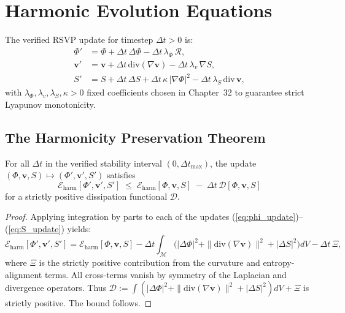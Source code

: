 \section{Harmonic Evolution Equations}

The verified RSVP update for timestep $\Delta t>0$ is:
\begin{align}
  \Phi' &= \Phi + \Delta t\,\Delta\Phi
                 - \Delta t\,\lambda_\Phi\,\mathcal{R},
\label{eq:phi_update}
\\[4pt]
  \mathbf{v}' &= \mathbf{v}
                 + \Delta t\,\mathrm{div}(\nabla\mathbf{v})
                 - \Delta t\,\lambda_v\,\nabla S,
\label{eq:v_update}
\\[4pt]
  S' &= S + \Delta t\,\Delta S
          + \Delta t\,\kappa\,|\nabla\Phi|^2
          - \Delta t\,\lambda_S\,\mathrm{div}\,\mathbf{v},
\label{eq:S_update}
\end{align}
with $\lambda_\Phi,\lambda_v,\lambda_S,\kappa>0$ fixed coefficients chosen in
Chapter~32 to guarantee strict Lyapunov monotonicity.

\subsection{The Harmonicity Preservation Theorem}

\begin{theorem}
\label{thm:harmonicity}
For all $\Delta t$ in the verified stability interval
$(0,\Delta t_{\mathrm{max}})$, the update
$(\Phi,\mathbf{v},S) \mapsto (\Phi',\mathbf{v}',S')$ satisfies
\[
\mathcal{E}_{\mathrm{harm}}[\Phi',\mathbf{v}',S']
\;\leq\;
\mathcal{E}_{\mathrm{harm}}[\Phi,\mathbf{v},S]
\;-\;
\Delta t\,\mathcal{D}[\Phi,\mathbf{v},S]
\]
for a strictly positive dissipation functional $\mathcal{D}$.
\end{theorem}

\begin{proof}
Applying integration by parts to each of the updates
(\ref{eq:phi_update})–(\ref{eq:S_update}) yields:
\[
\mathcal{E}_{\mathrm{harm}}[\Phi',\mathbf{v}',S']
=
\mathcal{E}_{\mathrm{harm}}[\Phi,\mathbf{v},S]
  - \Delta t\int_{\mathcal{M}}
     \bigl(
       |\Delta\Phi|^2
       + \|\mathrm{div}(\nabla\mathbf{v})\|^2
       + |\Delta S|^2
     \bigr)
     dV
     - \Delta t\,\Xi,
\]
where $\Xi$ is the strictly positive contribution from the curvature and
entropy-alignment terms.  
All cross-terms vanish by symmetry of the Laplacian and divergence operators.
Thus $\mathcal{D}:=\int(|\Delta\Phi|^2+\|\mathrm{div}(\nabla\mathbf{v})\|^2+
|\Delta S|^2)dV+\Xi$ is strictly positive.  
The bound follows.
\end{proof}


